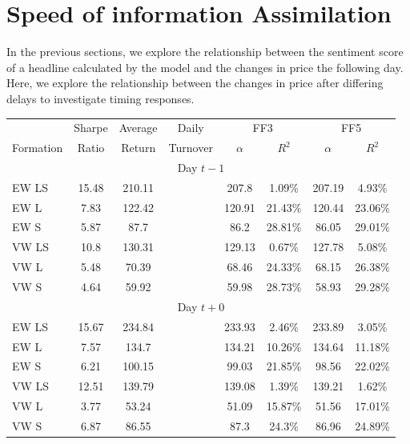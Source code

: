 
\section{Speed of information Assimilation}

In the previous sections, we explore the relationship between the sentiment score of a headline calculated by the model and the changes in price the following day. Here, we explore the relationship between the changes in price after differing delays to investigate timing responses.

\begin{table}[!t]
\begin{center}
\begin{tabular}{lccccccc}
      \toprule
      & Sharpe &  Average & Daily & \multicolumn{2}{c}{FF3} & \multicolumn{2}{c}{FF5} \\
      \cmidrule(lr){5-6}
      \cmidrule(lr){7-8}
      Formation & Ratio & Return & Turnover & $\alpha$ & $R^2$ & $\alpha$ & $R^2$ \\
      \midrule
      \multicolumn{8}{c}{Day $t-1$} \\
EW LS & 15.48 & 210.11 & & 207.8 & 1.09\% & 207.19 & 4.93\% \\
EW L & 7.83 & 122.42 & & 120.91 & 21.43\% & 120.44 & 23.06\% \\
EW S & 5.87 & 87.7 & & 86.2 & 28.81\% & 86.05 & 29.01\% \\
VW LS & 10.8 & 130.31 & & 129.13 & 0.67\% & 127.78 & 5.08\% \\
VW L & 5.48 & 70.39 & & 68.46 & 24.33\% & 68.15 & 26.38\% \\
VW S & 4.64 & 59.92 & & 59.98 & 28.73\% & 58.93 & 29.28\% \\
      \multicolumn{8}{c}{Day $t+0$} \\
EW LS & 15.67 & 234.84 & & 233.93 & 2.46\% & 233.89 & 3.05\% \\
EW L & 7.57 & 134.7 & & 134.21 & 10.26\% & 134.64 & 11.18\% \\
EW S & 6.21 & 100.15 & & 99.03 & 21.85\% & 98.56 & 22.02\% \\
VW LS & 12.51 & 139.79 & & 139.08 & 1.39\% & 139.21 & 1.62\% \\
VW L & 3.77 & 53.24 & & 51.09 & 15.87\% & 51.56 & 17.01\% \\
VW S & 6.87 & 86.55 & & 87.3 & 24.3\% & 86.96 & 24.89\% \\

\end{tabular}
\end{center}
\end{table}
